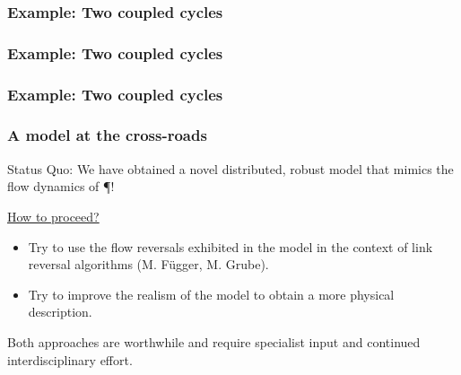 \documentclass[	hyperref={pdfpagelabels=false}, xcolor=dvipsnames,
		11pt]{beamer}
\begin{document}
\begin{frame}
	\frametitle{Example: Two coupled cycles}
		\begin{figure}
			\centering
			\captionsetup[subfloat]{position=bottom,labelformat=empty,font=scriptsize}
		\end{figure}
\end{frame}
\begin{frame}
	\frametitle{Example: Two coupled cycles}
		\begin{figure}
			\centering
			\captionsetup[subfloat]{position=bottom,labelformat=empty,font=scriptsize}
		\end{figure}
\end{frame}
\begin{frame}
	\frametitle{Example: Two coupled cycles}
		\begin{figure}
			\centering
			\captionsetup[subfloat]{position=bottom,labelformat=empty,font=scriptsize}
		\end{figure}
\end{frame}

\begin{frame}
	\frametitle{A model at the cross-roads}

	\begin{block}{Status Quo:}
		We have obtained a novel distributed, robust model that mimics the flow dynamics of \P!
	\end{block}
	\begin{alertblock}{\underline{How to proceed?}}
		\begin{itemize}
			\item Try to use the flow reversals exhibited in the model in the context of link reversal algorithms (M. Függer, M. Grube).
			\item Try to improve the realism of the model to obtain a more physical description.
		\end{itemize}
	\end{alertblock}

	Both approaches are worthwhile and require specialist input and continued interdisciplinary effort.
\end{frame}
\end{document}
